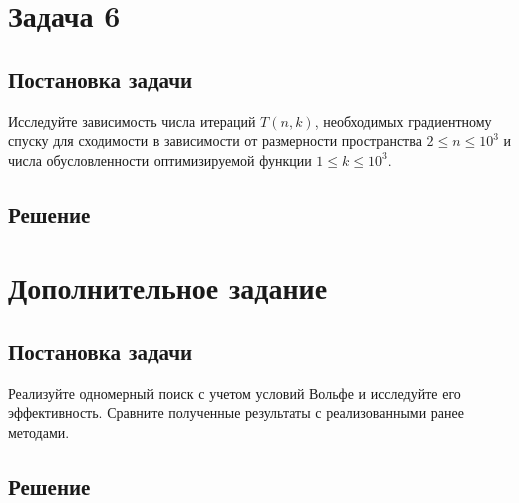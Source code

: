 \documentclass[12pt, a4paper, oneside]{article}
\begin{document}
	\section*{Задача 6}
	\subsection*{Постановка задачи}
	Исследуйте зависимость числа итераций $T(n, k)$, необходимых градиентному спуску для сходимости в зависимости от размерности пространства $2 \leqslant n \leqslant 10^{3}$ и числа обусловленности оптимизируемой функции $1 \leqslant k \leqslant 10^{3}$.
	\subsection*{Решение}
	\section*{Дополнительное задание}
	\subsection*{Постановка задачи}
	Реализуйте одномерный поиск с учетом условий Вольфе и исследуйте его эффективность. Сравните полученные результаты с реализованными ранее методами.
	\subsection*{Решение}
\end{document}

